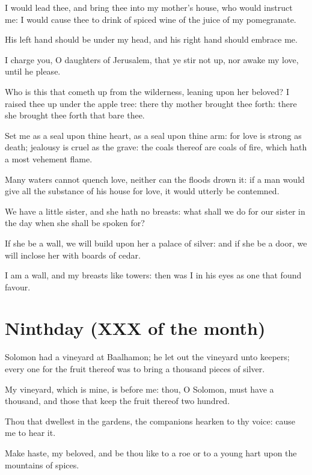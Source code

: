 I would lead thee, and bring thee into my mother's house, who would instruct me: I would cause thee to drink of spiced wine of the juice of my pomegranate.

His left hand should be under my head, and his right hand should embrace me.

I charge you, O daughters of Jerusalem, that ye stir not up, nor awake my love, until he please.

Who is this that cometh up from the wilderness, leaning upon her beloved? I raised thee up under the apple tree: there thy mother brought thee forth: there she brought thee forth that bare thee.

Set me as a seal upon thine heart, as a seal upon thine arm: for love is strong as death; jealousy is cruel as the grave: the coals thereof are coals of fire, which hath a most vehement flame.

Many waters cannot quench love, neither can the floods drown it: if a man would give all the substance of his house for love, it would utterly be contemned.

We have a little sister, and she hath no breasts: what shall we do for our sister in the day when she shall be spoken for?

If she be a wall, we will build upon her a palace of silver: and if she be a door, we will inclose her with boards of cedar.

I am a wall, and my breasts like towers: then was I in his eyes as one that found favour.

\section{Ninthday (XXX of the month)}

Solomon had a vineyard at Baalhamon; he let out the vineyard unto keepers; every one for the fruit thereof was to bring a thousand pieces of silver.

My vineyard, which is mine, is before me: thou, O Solomon, must have a thousand, and those that keep the fruit thereof two hundred.

Thou that dwellest in the gardens, the companions hearken to thy voice: cause me to hear it.

Make haste, my beloved, and be thou like to a roe or to a young hart upon the mountains of spices.
